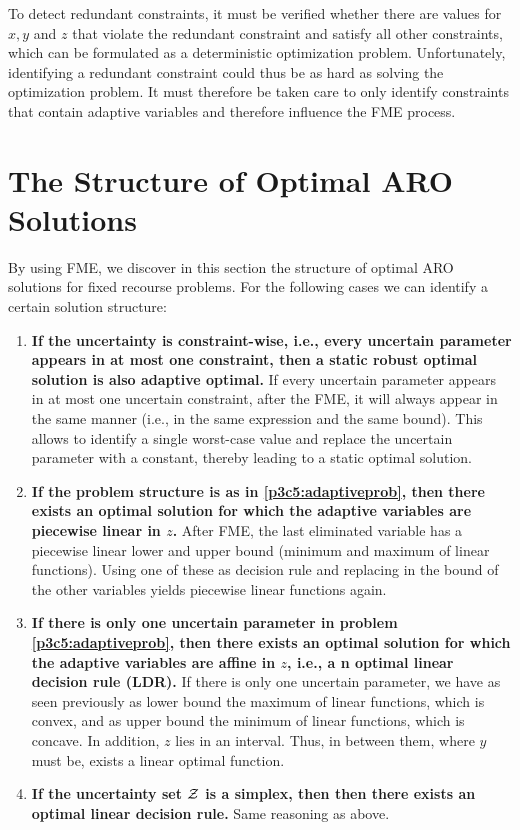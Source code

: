 To detect redundant constraints, it must be verified whether there are values for $x,y$ and $z$  that violate the redundant constraint and satisfy all other constraints, which can be formulated as a deterministic optimization problem. Unfortunately, identifying a redundant constraint could thus be as hard as solving the optimization problem. It must therefore be taken care to only identify constraints that contain adaptive variables and therefore influence the FME process.

\section{The Structure of Optimal ARO Solutions}

By using FME, we discover in this section the structure of optimal ARO solutions for fixed recourse problems. For the following cases we can identify a certain solution structure:
\begin{enumerate}
	\item \textbf{If the uncertainty is constraint-wise, i.e., every uncertain parameter appears in at most one constraint, then a static robust optimal solution is also adaptive optimal.} If every uncertain parameter appears in at most one uncertain constraint, after the FME, it will always appear in the same manner (i.e., in the same expression and the same bound). This allows to identify a single worst-case value and replace the uncertain parameter with a constant, thereby leading to a static optimal solution.
	
	\item \textbf{If the problem structure is as in \eqref{p3c5:adaptiveprob}, then there exists an optimal solution for which the adaptive variables are piecewise linear in $z$.} After FME, the last eliminated variable has a piecewise linear lower and upper bound (minimum and maximum of linear functions). Using one of these as decision rule and replacing in the bound of the other variables yields piecewise linear functions again.
	
	\item \textbf{If there is only one uncertain parameter in problem \eqref{p3c5:adaptiveprob}, then there exists an optimal solution for which the adaptive variables are affine in $z$, i.e., a n optimal linear decision rule (LDR). } If there is only one uncertain parameter, we have as seen previously as lower bound the maximum of linear functions, which is convex, and as upper bound the minimum of linear functions, which is concave. In addition, $z$ lies in an interval. Thus, in between them, where $y$ must be, exists a linear optimal function.
	
	\item \textbf{ If the uncertainty set $\mathcal{Z}$ is a simplex, then then there exists an optimal linear decision rule.}  Same reasoning as above.
\end{enumerate}

